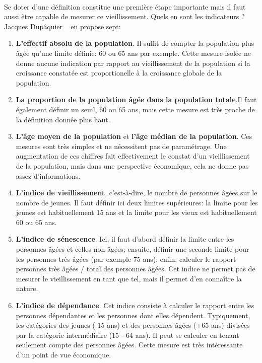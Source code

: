 \paragraph{}Se doter d’une définition constitue une première étape importante mais il faut aussi être capable de mesurer ce vieillissement. Quels en sont les indicateurs ? Jacques Dupâquier ~\citep[pp.10-11]{dupaquier} en propose sept: 
\begin{enumerate}
  \item \textbf{L’effectif absolu de la population}. Il suffit de compter la population plus âgée qu’une limite définie: 60 ou 65 ans par exemple. Cette mesure isolée ne donne aucune indication par rapport au vieillissement de la population si la croissance constatée est proportionelle à la croissance globale de la population.
  \item \textbf{La proportion de la population âgée dans la population totale}.Il faut également définir un seuil, 60 ou 65 ans, mais cette mesure est très proche de la définition donnée plus haut. 
  \item \textbf{L'âge moyen de la population} et \textbf{l’âge médian de la population}. Ces mesures sont très simples et ne nécessitent pas de paramétrage. Une augmentation de ces chiffres fait effectivement le constat d’un vieillissement de la population, mais dans une perspective économique, cela ne donne pas assez d’informations. 
  \item \textbf{L’indice de vieillissement}, c’est-à-dire, le nombre de personnes âgées sur le nombre de jeunes. Il faut définir ici deux limites supérieures: la limite pour les jeunes est habituellement 15 ans et la limite pour les vieux est habituellement 60 ou 65 ans.
  \item \textbf{L’indice de sénescence}. Ici, il faut d’abord définir la limite entre les personnes âgées et celles non âgées; ensuite, définir une seconde limite pour les personnes très âgées (par exemple 75 ans); enfin, calculer le rapport personnes très âgées / total des personnes âgées. Cet indice ne permet pas de mesurer le vieillissement en tant que tel, mais il permet d'en connaître la nature.
  \item \textbf{L’indice de dépendance}. Cet indice consiste à calculer le rapport entre les personnes dépendantes et les personnes dont elles dépendent. Typiquement, les catégories des jeunes (-15 ans) et des personnes âgées (+65 ans) divisées par la catégorie intermédiaire (15 - 64 ans). Il peut se calculer en tenant seulement compte des personnes âgées. Cette mesure est très intéressante d’un point de vue économique. 
\end{enumerate}
